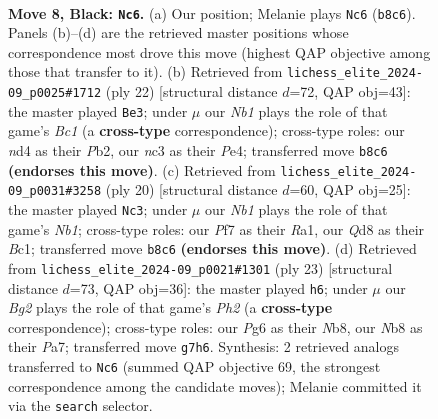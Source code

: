 \documentclass[11pt]{article}
\begin{document}
\begin{figure}[p]\centering
\begin{subfigure}{0.46\textwidth}\centering
\resizebox{\linewidth}{!}{%
\newchessgame
\chessboard[
  setfen={rnbq1rk1/ppp2pbp/3p1np1/8/2PNP3/2N5/PP2BPPP/R1BQ1RK1 b - - 0 8},
  showmover=false,
  pgfstyle=straightmove, color=movearrow, markmove={b8-c6}
]}
\caption{}
\end{subfigure}\hfill
\begin{subfigure}{0.46\textwidth}\centering
\resizebox{\linewidth}{!}{%
\newchessgame
\chessboard[
  setfen={r1bq1rk1/pp1nnppp/3p4/3Pp3/4P3/5NP1/PP3PBP/R1BQ1RK1 w - - 1 12},
  showmover=false,
  pgfstyle=straightmove, color=movearrow, markmove={c1-e3}
]}
\caption{}
\end{subfigure}
\\[4pt]
\begin{subfigure}{0.46\textwidth}\centering
\resizebox{\linewidth}{!}{%
\newchessgame
\chessboard[
  setfen={2rqkb1r/p2b1ppp/2n1pn2/1p6/2pP4/5NP1/PP2PPBP/RNBQ1RK1 w k - 2 11},
  showmover=false,
  pgfstyle=straightmove, color=movearrow, markmove={b1-c3}
]}
\caption{}
\end{subfigure}\hfill
\begin{subfigure}{0.46\textwidth}\centering
\resizebox{\linewidth}{!}{%
\newchessgame
\chessboard[
  setfen={rnbq1rk1/ppb2ppp/3p1n2/3P4/1P6/P1NB4/4NPPP/R1BQ1RK1 b - - 0 12},
  showmover=false,
  pgfstyle=straightmove, color=movearrow, markmove={h7-h6}
]}
\caption{}
\end{subfigure}
\caption{\textbf{Move 8, Black: \texttt{Nc6}.} (a) Our position; Melanie plays \texttt{Nc6} (\texttt{b8c6}). Panels (b)--(d) are the retrieved master positions whose correspondence most drove this move (highest QAP objective among those that transfer to it). (b) Retrieved from \texttt{lichess\_elite\_2024-09\_p0025\#1712} (ply 22) [structural distance $d$=72, QAP obj=43]: the master played \texttt{Be3}; under $\mu$ our \emph{Nb1} plays the role of that game's \emph{Bc1} (a \textbf{cross-type} correspondence); cross-type roles: our \emph{n}d4 as their \emph{P}b2, our \emph{n}c3 as their \emph{P}e4; transferred move \texttt{b8c6} \textbf{(endorses this move)}. (c) Retrieved from \texttt{lichess\_elite\_2024-09\_p0031\#3258} (ply 20) [structural distance $d$=60, QAP obj=25]: the master played \texttt{Nc3}; under $\mu$ our \emph{Nb1} plays the role of that game's \emph{Nb1}; cross-type roles: our \emph{P}f7 as their \emph{R}a1, our \emph{Q}d8 as their \emph{B}c1; transferred move \texttt{b8c6} \textbf{(endorses this move)}. (d) Retrieved from \texttt{lichess\_elite\_2024-09\_p0021\#1301} (ply 23) [structural distance $d$=73, QAP obj=36]: the master played \texttt{h6}; under $\mu$ our \emph{Bg2} plays the role of that game's \emph{Ph2} (a \textbf{cross-type} correspondence); cross-type roles: our \emph{P}g6 as their \emph{N}b8, our \emph{N}b8 as their \emph{P}a7; transferred move \texttt{g7h6}. Synthesis: 2 retrieved analogs transferred to \texttt{Nc6} (summed QAP objective 69, the strongest correspondence among the candidate moves); Melanie committed it via the \texttt{search} selector.}
\label{fig:thought-m15}
\end{figure}
\end{document}
